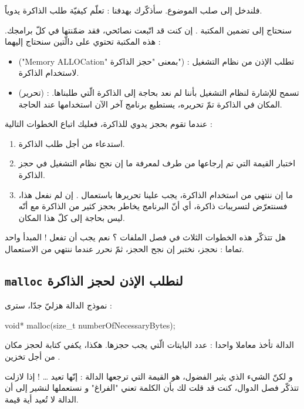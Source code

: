 فلندخل إلى صلب الموضوع. سأذكّرك بهدفنا : تعلّم كيفيّة طلب الذاكرة يدوياً.

سنحتاج إلى تضمين المكتبة
.
إن كنت قد اتّبعت نصائحي، فقد ضمّنتها في كلّ برامجك. هذه المكتبة تحتوي على دالّتين سنحتاج إليهما :

\begin{itemize}
  \item {} ("\textenglish{Memory ALLOCation}"
بمعنى "حجز الذاكرة") : تطلب الإذن من نظام التشغيل لاستخدام الذاكرة.
  \item {}
(تحرير) : تسمح للإشارة لنظام التشغيل بأننا لم نعد بحاجة إلى الذاكرة الّتي طلبناها. المكان في الذاكرة تمّ تحريره، يستطيع برنامج آخر الآن استخدامها عند الحاجة.
\end{itemize}

عندما تقوم بحجز يدوي للذاكرة، فعليك اتباع الخطوات التالية :

\begin{enumerate}
  \item استدعاء
من أجل طلب الذاكرة.
  \item اختبار القيمة التي تم إرجاعها من طرف
لمعرفة ما إن نجح نظام التشغيل في حجز الذاكرة.
  \item ما إن ننتهي من استخدام الذاكرة، يجب علينا تحريرها باستعمال
.
إن لم نفعل هذا، فسنتعرّض لتسريبات ذاكرة، أي أنّ البرنامج يخاطر بحجز كثير من الذاكرة مع أنّه ليس بحاجة إلى كلّ هذا المكان.
\end{enumerate}

هل تتذكّر هذه الخطوات الثلاث في فصل الملفات ؟ نعم يجب أن تفعل ! المبدأ واحد تماما : نحجز، نختبر إن نجح الحجز، ثمّ نحرر عندما ننتهي من الاستعمال.

\subsection{\texttt{malloc} لنطلب الإذن لحجز الذاكرة}
نموذج الدالة
هزليّ جدّا، سترى :

\begin{Csource}
void* malloc(size_t numberOfNecessaryBytes);
\end{Csource}

الدالة تأخذ معاملا واحدا : عدد البايتات الّتي يجب حجزها. هكذا، يكفي كتابة
لحجز مكان من أجل تخزين
.

و لكنّ الشيء الذي يثير الفضول، هو القيمة التي ترجعها الدالة : إنّها تعيد \dots
{} !
إذا لازلت تتذكّر فصل الدوال، كنت قد قلت لك بأن الكلمة
تعني "الفراغ" و نستعملها لنشير إلى أن الدالة لا تُعيد أية قيمة.

